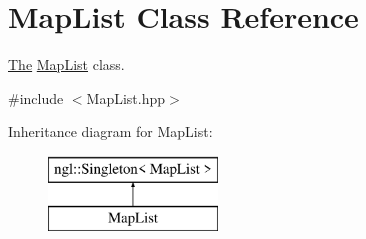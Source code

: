 \hypertarget{class_map_list}{}\section{Map\+List Class Reference}
\label{class_map_list}


\hyperlink{namespace_the}{The} \hyperlink{class_map_list}{Map\+List} class.  




{\ttfamily \#include $<$Map\+List.\+hpp$>$}

Inheritance diagram for Map\+List\+:\begin{figure}[H]
\begin{center}
\leavevmode
\includegraphics[height=2.000000cm]{class_map_list}
\end{center}
\end{figure}
